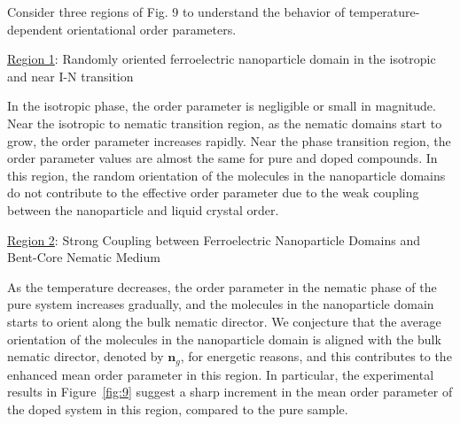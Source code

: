 \documentclass[reprint,amsfonts,amsmath,amssymb,aps,pre,floatfix,10pt]{revtex4-1}
\begin{document}
Consider three regions of Fig. 9 to understand the behavior of temperature-dependent orientational order parameters.

\underline{Region 1}: Randomly oriented ferroelectric nanoparticle domain in the isotropic and near I-N transition

In the isotropic phase, the order parameter is negligible or small in magnitude. Near the isotropic to nematic transition region, as the nematic domains start to grow, the order parameter increases rapidly. Near the phase transition region, the order parameter values are almost the same for pure and doped compounds. In this region, the random orientation of the molecules in the nanoparticle domains do not contribute to the effective order parameter due to the weak coupling between the nanoparticle and liquid crystal order. 

\underline{Region 2}: Strong Coupling between Ferroelectric Nanoparticle Domains and Bent-Core Nematic Medium %

As the temperature decreases, the order parameter in the nematic phase of the pure system increases gradually, and the molecules in the nanoparticle domain starts to orient along the bulk nematic director.  
We conjecture that the average orientation of the molecules in the nanoparticle domain is aligned with the bulk nematic director, denoted by $\mathbf{n}_g$, for energetic reasons, and this contributes to the enhanced mean order parameter in this region. In particular, the experimental results in Figure~\ref{fig:9} suggest a sharp increment in the mean order parameter of the doped system in this region, compared to the pure sample.
\end{document}
